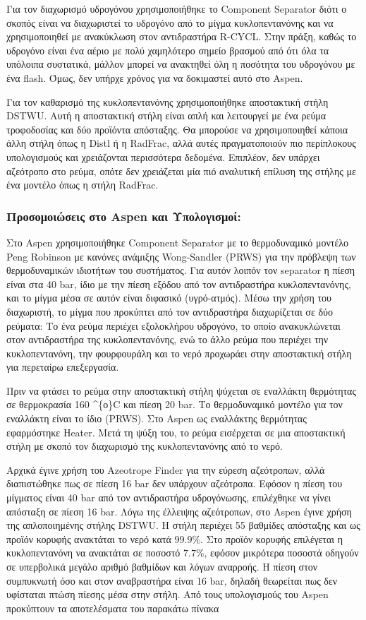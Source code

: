 \documentclass[11pt]{article}
\begin{document}
Για τον διαχωρισμό υδρογόνου χρησιμοποιήθηκε το Component Separator
διότι ο σκοπός είναι να διαχωριστεί το υδρογόνο από το μίγμα
κυκλοπεντανόνης και να χρησιμοποιηθεί με ανακύκλωση στον αντιδραστήρα
R-CYCL. Στην πράξη, καθώς το υδρογόνο είναι ένα αέριο με πολύ χαμηλότερο σημείο βρασμού από ότι όλα τα υπόλοιπα συστατικά, μάλλον μπορεί να ανακτηθεί όλη η ποσότητα του υδρογόνου με ένα flash. Όμως, δεν υπήρχε χρόνος για να δοκιμαστεί αυτό στο Aspen.

Για τον καθαρισμό της κυκλοπεντανόνης χρησιμοποιήθηκε αποστακτική στήλη
DSTWU. Αυτή η αποστακτική στήλη είναι απλή και λειτουργεί με ένα ρεύμα
τροφοδοσίας και δύο προϊόντα απόσταξης. Θα μπορούσε να χρησιμοποιηθεί
κάποια άλλη στήλη όπως η Distl ή η RadFrac, αλλά αυτές πραγματοποιούν
πιο περίπλοκους υπολογισμούς και χρειάζονται περισσότερα δεδομένα.
Επιπλέον, δεν υπάρχει αζεότροπο στο ρεύμα, οπότε δεν χρειάζεται μία πιό αναλυτική επίλυση της στήλης με ένα μοντέλο όπως η στήλη RadFrac.

\subsubsection{Προσομοιώσεις στο Aspen και Υπολογισμοί:}
\label{sec:org4f42304}
Στο Aspen χρησιμοποιήθηκε Component Separator με το θερμοδυναμικό
μοντέλο Peng Robinson με κανόνες ανάμιξης Wong-Sandler (PRWS) για την
πρόβλεψη των θερμοδυναμικών ιδιοτήτων του συστήματος. Για αυτόν λοιπόν
τον separator η πίεση είναι στα 40 bar, ίδιο με την πίεση εξόδου από τον
αντιδραστήρα κυκλοπεντανόνης, και το μίγμα μέσα σε αυτόν είναι διφασικό
(υγρό-ατμός). Μέσω την χρήση του διαχωριστή, το μίγμα που προκύπτει από
τον αντιδραστήρα διαχωρίζεται σε δύο ρεύματα: Το ένα ρεύμα περιέχει
εξολοκλήρου υδρογόνο, το οποίο ανακυκλώνεται στον αντιδραστήρα της
κυκλοπεντανόνης, ενώ το άλλο ρεύμα που περιέχει την κυκλοπεντανόνη, την
φουρφουράλη και το νερό προχωράει στην αποστακτική στήλη για περεταίρω
επεξεργασία.

Πριν να φτάσει το ρεύμα στην αποστακτική στήλη ψύχεται σε εναλλάκτη
θερμότητας σε θερμοκρασία 160 \^{}\{ο\}C και πίεση 20 bar. Το θερμοδυναμικό
μοντέλο για τον εναλλάκτη είναι το ίδιο (PRWS). Στο Aspen ως
εναλλάκτης θερμότητας εφαρμόστηκε Heater. Μετά τη ψύξη του, το ρεύμα
εισέρχεται σε μια αποστακτική στήλη με σκοπό τον διαχωρισμό της
κυκλοπεντανόνης από το νερό.

Αρχικά έγινε χρήση του Azeotrope Finder για την εύρεση αζεότροπων, αλλά
διαπιστώθηκε πως σε πίεση 16 bar δεν υπάρχουν αζεότροπα. Εφόσον η πίεση
του μίγματος είναι 40 bar από τον αντιδραστήρα υδρογόνωσης, επιλέχθηκε
να γίνει απόσταξη σε πίεση 16 bar. Λόγω της έλλειψης αζεότροπων, στο
Aspen έγινε χρήση της απλοποιημένης στήλης DSTWU. Η στήλη περιέχει 55
βαθμίδες απόσταξης και ως προϊόν κορυφής ανακτάται το νερό κατά \(99.9 \%\).
Στο προϊόν κορυφής επιλέγεται η κυκλοπεντανόνη να ανακτάται σε ποσοστό
\(7.7 \%\), εφόσον μικρότερα ποσοστά οδηγούν σε υπερβολικά μεγάλο αριθμό
βαθμίδων και λόγων αναρροής. Η πίεση στον συμπυκνωτή όσο και στον
αναβραστήρα είναι 16 bar, δηλαδή θεωρείται πως δεν υφίσταται πτώση
πίεσης μέσα στην στήλη. Από τους υπολογισμούς του Aspen προκύπτουν τα αποτελέσματα του παρακάτω πίνακα
\end{document}
